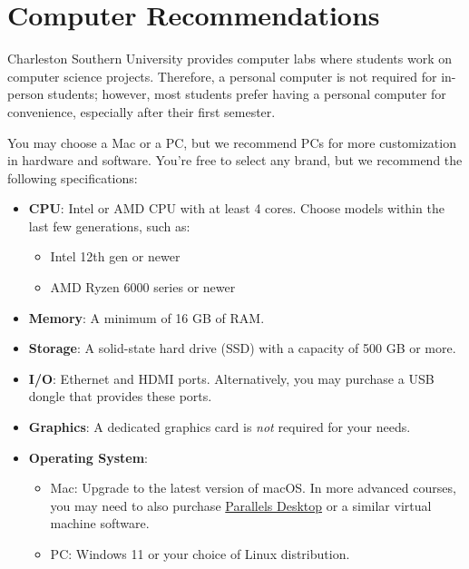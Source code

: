 \section{Computer Recommendations}
Charleston Southern University provides computer labs where students work on computer science projects. Therefore, a personal computer is not required for in-person students; however, most students prefer having a personal computer for convenience, especially after their first semester.

\vspace{1em}
You may choose a Mac or a PC, but we recommend PCs for more customization in hardware and software. You're free to select any brand, but we recommend the following specifications:

\begin{itemize}
    \item
        \textbf{CPU}: Intel or AMD CPU with at least 4 cores. Choose models within the last few generations, such as:
        \begin{itemize}
            \item Intel 12th gen or newer
            \item AMD Ryzen 6000 series or newer
        \end{itemize}
    \item
        \textbf{Memory}: A minimum of 16 GB of RAM\@.
    \item
        \textbf{Storage}: A solid-state hard drive (SSD) with a capacity of 500 GB or more.
    \item
        \textbf{I/O}: Ethernet and HDMI ports. Alternatively, you may purchase a USB dongle that provides these ports.
    \item
        \textbf{Graphics}: A dedicated graphics card is \emph{not} required for your needs.
    \item
        \textbf{Operating System}:
        \begin{itemize}
            \item {Mac}: Upgrade to the latest version of macOS\@. In more advanced courses, you may need to also purchase \href{https://www.parallels.com/products/desktop/}{Parallels Desktop} or a similar virtual machine software.
            \item {PC}: Windows 11 or your choice of Linux distribution.
        \end{itemize}
\end{itemize}